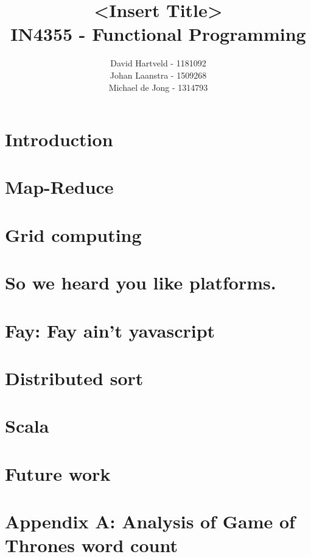 \documentclass{article}
\title{<Insert Title>\\
IN4355 - Functional Programming}
\author{David Hartveld - 1181092 \\
		Johan Laanstra - 1509268 \\
		Michael de Jong - 1314793}
\begin{document}
\maketitle

\section{Introduction}
	
		
\section{Map-Reduce}
	
	
\section{Grid computing}
	
	
\section{So we heard you like platforms.}
	
	
\section{Fay: Fay ain't yavascript}
	
	
\section{Distributed sort}
	
	
\section{Scala}
	
	
	
\section{Future work}
	
	


	
\pagebreak


\section{Appendix A: Analysis of Game of Thrones word count}
	
\end{document}
